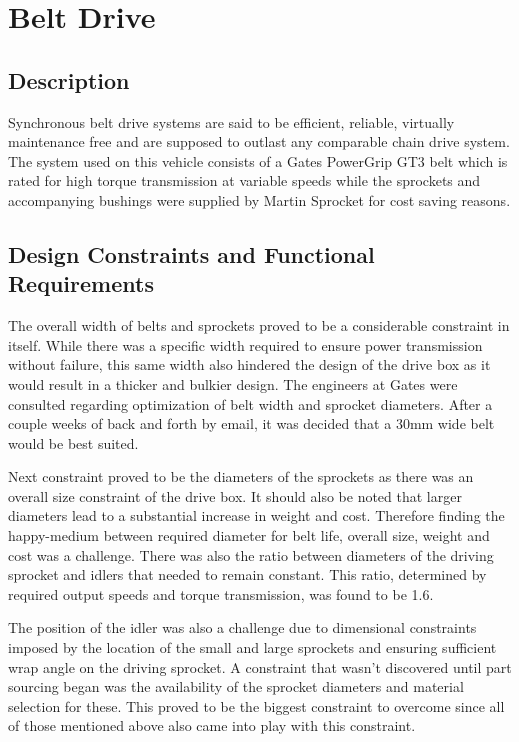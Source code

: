 \section{Belt Drive}
\subsection{Description}
Synchronous belt drive systems are said to be efficient, reliable, virtually maintenance free and are supposed to outlast any comparable chain drive system. The system used on this vehicle consists of a Gates PowerGrip GT3 belt which is rated for high torque transmission at variable speeds while the sprockets and accompanying bushings were supplied by Martin Sprocket for cost saving reasons.

\subsection{Design Constraints and Functional Requirements}
The overall width of belts and sprockets proved to be a considerable constraint in itself. While there was a specific width required to ensure power transmission without failure, this same width also hindered the design of the drive box as it would result in a thicker and bulkier design. The engineers at Gates were consulted regarding optimization of belt width and sprocket diameters. After a couple weeks of back and forth by email, it was decided that a 30mm wide belt would be best suited.

Next constraint proved to be the diameters of the sprockets as there was an overall size constraint of the drive box. It should also be noted that larger diameters lead to a substantial increase in weight and cost. Therefore finding the happy-medium between required diameter for belt life, overall size, weight and cost was a challenge. There was also the ratio between diameters of the driving sprocket and idlers that needed to remain constant. This ratio, determined by required output speeds and torque transmission, was found to be 1.6.

The position of the idler was also a challenge due to dimensional constraints imposed by the location of the small and large sprockets and ensuring sufficient wrap angle on the driving sprocket. A constraint that wasn’t discovered until part sourcing began was the availability of the sprocket diameters and material selection for these. This proved to be the biggest constraint to overcome since all of those mentioned above also came into play with this constraint.

